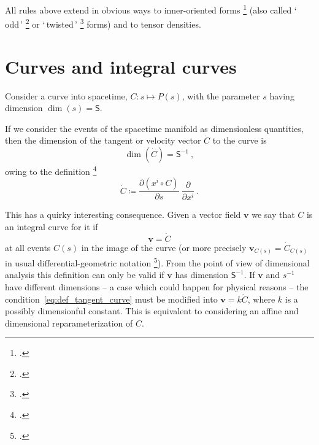 \documentclass[\ifafour a4paper,12pt,\else a5paper,10pt,\fi%
onecolumn,oneside,article,%
british%
]{memoir}
\newcommand*{\defquote}[1]{`\,#1\,'}
\theoremstyle{remark}
\theoremstyle{innote}
\newcommand*{\citep}{\footcites}
\newcommand*{\de}{\partialup}%
\newcommand*{\defd}{\coloneqq}
\renewcommand*{\|}[1][]{\nonscript\,#1\vert\nonscript\;\mathopen{}}
\newcommand*{\sect}{\S}%
\newcommand*{\chap}{ch.}%
\newcommand*{\Ss}{\textsf{S}}
\newcommand*{\yv}{\bm{v}}
\newcommand*{\dex}[1][i]{\frac{\de}{\de x^{#1}}}
\begin{document}
All rules above extend in obvious ways to inner-oriented forms
\citep[\chap~II]{schouten1951_r1989} (also called \defquote{odd}
\citep[\chap~II]{derham1955_t1984} or \defquote{twisted}
\citep{burke1983,burke1995}[\chap~3]{bossavit1991} forms) and to tensor densities.


\section{Curves and integral curves}
\label{sec:curves}


Consider a curve into spacetime, $C\colon s \mapsto P(s)$, with the
parameter $s$ having dimension $\dim(s)=\Ss$.


If we consider the events of the spacetime manifold as dimensionless
quantities, then the dimension of the tangent or velocity vector $\dot{C}$
to the curve is
\begin{equation}
  \label{eq:dim_velocity}
  \dim(\dot{C}) = \Ss^{-1} \ ,
\end{equation}
owing to the definition
\citep[\sect~III.B.1]{choquetbruhatetal1977_r1996}[\sect~IV.(1.9)]{boothby1975_r2003}
\begin{equation}
  \label{eq:def_tangent_curve}
\dot{C} \defd \frac{\de (x^{i} \circ C)}{\de s}\ \dex \ .
\end{equation}

This has a quirky  interesting consequence. Given a vector field $\yv$
we say that $C$ is an integral curve for it if
\begin{equation}
  \yv = \dot{C}
  \label{eq:integral_curve}
\end{equation}
at all events $C(s)$ in the image of the curve (or more precisely
$\yv_{C(s)} = \dot{C}_{C(s)}$ in usual differential-geometric notation
\citep[\sect~III.B.1]{choquetbruhatetal1977_r1996}). From the point of view
of dimensional analysis this definition can only be valid if $\yv$ has
dimension $\Ss^{-1}$. If $\yv$ and $s^{-1}$ have different dimensions -- a
case which could happen for physical reasons -- the
condition~\eqref{eq:def_tangent_curve} must be modified into
$\yv = k\dot{C}$, where $k$ is a possibly dimensionful constant. This is
equivalent to considering an affine and dimensional reparameterization of
$C$.

\end{document}
